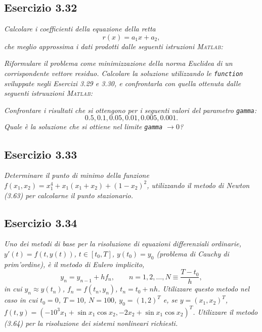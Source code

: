 \subsection{Esercizio 3.32}
\emph{Calcolare i coefficienti della equazione della retta
$$r(x)=a_1x+a_2,$$
che meglio approssima i dati prodotti dalle seguenti istruzioni \textsc{Matlab}:}

\emph{Riformulare il problema come minimizzazione della norma Euclidea di un corrispondente vettore residuo. Calcolare la soluzione utilizzando le \lstinline{function} sviluppate negli Esercizi 3.29 e 3.30, e confrontarla con quella ottenuta dalle seguenti istruuzioni \textsc{Matlab}:}

\emph{Confrontare i risultati che si ottengono per i seguenti valori del parametro \lstinline{gamma}:
$$0.5,0.1,0.05,0.01,0.005,0.001.$$
Quale è la soluzione che si ottiene nel limite \lstinline{gamma} $\rightarrow 0$?}
\subsection{Esercizio 3.33}
\emph{Determinare il punto di minimo della funzione $f(x_1,x_2)=x_1^4+x_1(x_1+x_2)+(1-x_2)^2$, utilizzando il metodo di Newton (3.63) per calcolarne il punto stazionario.}
\subsection{Esercizio 3.34}
\emph{Uno dei metodi di base per la risoluzione di equazioni differenziali ordinarie, $y'(t)=f(t,y(t))$, $t\in[t_0,T]$, $y(t_0)=y_0$ (problema di Cauchy di prim'ordine), è il metodo di Eulero implicito,
$$y_n=y_{n-1}+hf_n,\qquad n=1,2,\dots,N\equiv\frac{T-t_0}{h},$$
in cui $y_n\approx y(t_n)$, $f_n=f(t_n,y_n)$, $t_n=t_0+nh$. Utilizzare questo metodo nel caso in cui $t_0=0$, $T=10$, $N=100$, $y_0=(1,2)^T$ e, se $y=(x_1,x_2)^T$, $f(t,y)=(-10^3x_1+\sin x_1\cos x_2, -2x_2+\sin x_1 \cos x_2)^T$. Utilizzare il metodo (3.64) per la risoluzione dei sistemi nonlineari richiesti.}
